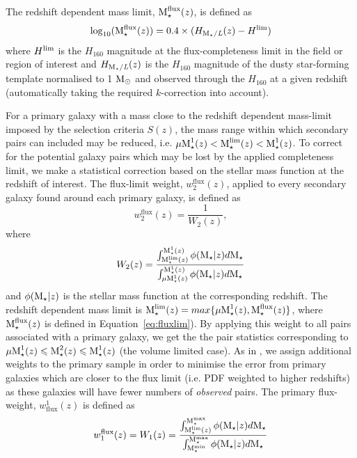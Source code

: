 The redshift dependent mass limit, $\text{M}_{\star}^{\rm{flux}}(z)$, is defined as
\begin{equation}\label{eq:fluxlim}
	\log_{10}(\text{M}_{\star}^{\rm{flux}}(z)) = 	0.4\times( H_{\text{M}_{\star}/\textit{L}}(z) - H^{\rm{lim}})
\end{equation}
where $H^{\rm{lim}}$ is the $H_{160}$ magnitude at the flux-completeness limit in the field or region of interest and $H_{\text{M}_{\star}/\textit{L}}(z)$ is the $H_{160}$ magnitude of the dusty star-forming template normalised to 1 $\rm{M}_{\odot}$ and observed through the $H_{160}$ at a given redshift (automatically taking the required $k$-correction into account).

For a primary galaxy with a mass close to the redshift dependent mass-limit imposed by the selection criteria $S(z)$, the mass range within which secondary pairs can included may be reduced, i.e.  $\mu\text{M}_{\star}^{1}(z) <  \text{M}_{\star}^{\rm{lim}}(z) < \text{M}_{\star}^{1}(z)$. To correct for the potential galaxy pairs which may be lost by the applied completeness limit, we make a statistical correction based on the stellar mass function at the redshift of interest. The flux-limit weight, $w^{\text{flux}}_{2}(z)$, applied to every secondary galaxy found around each primary galaxy, is defined as 
\begin{equation}
	w^{\text{flux}}_{2}(z) = \frac{1} {W_{2}(z)},	
\end{equation}
where 
\begin{equation}
	W_{2}(z) = \frac{ \int_{\text{M}_{\star}^{\text{lim}}(z)}^{\text{M}_{\star}^{\text{1}}(z)} 
								\phi(\text{M}_{\star}|z)d\text{M}_{\star}} 
								{ \int_{\mu \text{M}_{\star}^{1}(z)}^{\text{M}_{\star}^{\text{1}}(z)}
								\phi(\text{M}_{\star}|z)d\text{M}_{\star}}
\end{equation}
and \( \phi(\text{M}_{\star}|z) \) is the stellar mass function at the corresponding redshift. The redshift dependent mass limit is \(\text{M}_{\star}^{\text{lim}}(z) = max \{ \mu \text{M}_{\star}^{1}(z), \text{M}_{\star}^{\rm{flux}}(z) \} \), where \(\text{M}_{\star}^{\rm{flux}}(z)\) is defined in Equation~\ref{eq:fluxlim}). By applying this weight to all pairs associated with a primary galaxy, we get the the pair statistics corresponding to $\mu \text{M}_{\star}^{1}(z) \leqslant \text{M}_{\star}^{\text{2}}(z) \leqslant \text{M}_{\star}^{\text{1}}(z)$ (the volume limited case). As in \citet{Patton:2000kt}, we assign additional weights to the primary sample in order to minimise the error from primary galaxies which are closer to the flux limit (i.e. PDF weighted to higher redshifts) as these galaxies will have fewer numbers of \emph{observed} pairs. The primary flux-weight, $w_{\text{flux}}^{1}(z)$ is defined as
\begin{equation}
	w^{\text{flux}}_{1}(z) =  W_{1}(z) = \frac{ \int_{\text{M}_{\star}^{\text{lim}}(z)}^{\text{M}_{\star}^{\rm{max}}} 
																	\phi(\text{M}_{\star}|z)d\text{M}_{\star}} { \int_{\text{M}_{\star}^{\rm{min}}}^{\text{M}_{\star}^{\rm{max}}}
																	\phi(\text{M}_{\star}|z)d\text{M}_{\star}}
\end{equation}
